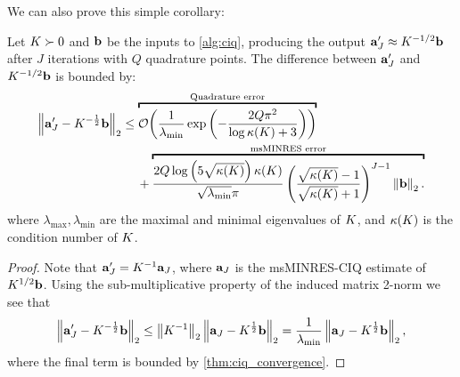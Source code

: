 We can also prove this simple corollary:
%
\begin{corollary}
  Let $K\succ 0$ and $\mathbf{b}$ be the inputs to \cref{alg:ciq}, producing the output $\mathbf{a}_J' \approx K^{-1/2} \mathbf{b}$ after $J$ iterations with $Q$ quadrature points.
  The difference between $\mathbf{a}_J'$ and $K^{-1/2} \mathbf{b}$ is bounded by:
  \begin{align*}
    \left\Vert \ba_J' - \bK^{-\frac 1 2} \bb \right\Vert_2
    &\leq
    \overbracket{
      \bigo{ \frac{1}{\lambda_\text{min}} \exp\left( -\frac  {2 Q \pi^2}{\log \kappa(\bK) + 3} \right)}
    }^{\text{Quadrature error}}
    \\
    &\phantom{=} \:\: +
    \overbracket{
      \frac{ 2 Q \log \left( 5 \sqrt{\kappa(\bK)} \right) \kappa(\bK) }{ \sqrt{\lambda_\text{min}} \pi}
      \left( \frac{ \sqrt{\kappa(\bK)} - 1}{ \sqrt{\kappa(\bK)} + 1} \right)^{J-1}
      \left\Vert \bb \right\Vert_2.
    }^{\text{msMINRES error}}
  \end{align*}
  where $\lambda_\text{max},\lambda_{\text{min}}$ are the maximal and minimal eigenvalues of $K$, and $\kappa(K)$ is the condition number of $K$.
  \label{thm:ciq_convergence_inverse}
\end{corollary}

\begin{proof}
  Note that $\mathbf{a}_J' = K^{-1} \mathbf{a}_J$, where $\mathbf{a}_J$ is the msMINRES-CIQ estimate of $K^{1/2} \mathbf{b}$.
  Using the sub-multiplicative property of the induced matrix 2-norm we see that
  \[
    \left\Vert \mathbf{a}_J' - K^{-\frac 1 2} \mathbf{b} \right\Vert_2
    \leq \left\Vert K^{-1} \right\Vert_2 \left\Vert \mathbf{a}_J - K^{\frac 1 2} \mathbf{b} \right\Vert_2
    = \frac{1}{\lambda_\text{min}} \left\Vert \mathbf{a}_J - K^{\frac 1 2} \mathbf{b} \right\Vert_2,
  \]
  where the final term is bounded by \cref{thm:ciq_convergence}.
\end{proof}
